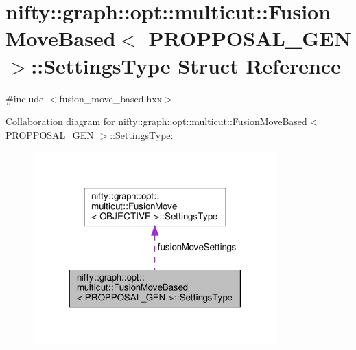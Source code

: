 \hypertarget{structnifty_1_1graph_1_1opt_1_1multicut_1_1FusionMoveBased_1_1SettingsType}{}\section{nifty\+:\+:graph\+:\+:opt\+:\+:multicut\+:\+:Fusion\+Move\+Based$<$ P\+R\+O\+P\+P\+O\+S\+A\+L\+\_\+\+G\+EN $>$\+:\+:Settings\+Type Struct Reference}
\label{structnifty_1_1graph_1_1opt_1_1multicut_1_1FusionMoveBased_1_1SettingsType}


{\ttfamily \#include $<$fusion\+\_\+move\+\_\+based.\+hxx$>$}



Collaboration diagram for nifty\+:\+:graph\+:\+:opt\+:\+:multicut\+:\+:Fusion\+Move\+Based$<$ P\+R\+O\+P\+P\+O\+S\+A\+L\+\_\+\+G\+EN $>$\+:\+:Settings\+Type\+:
\nopagebreak
\begin{figure}[H]
\begin{center}
\leavevmode
\includegraphics[width=267pt]{structnifty_1_1graph_1_1opt_1_1multicut_1_1FusionMoveBased_1_1SettingsType__coll__graph}
\end{center}
\end{figure}
